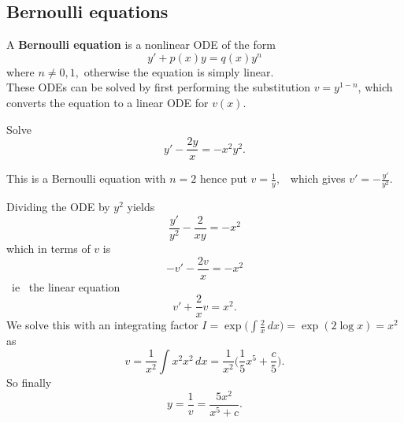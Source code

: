\subsection{Bernoulli equations}
A \textbf{Bernoulli equation} is a nonlinear ODE of the form \[y'+p(x)y=q(x)y^n\] where $n\ne 0,1,$ otherwise the equation is simply linear.\\

These ODEs can be solved by first performing the substitution $v=y^{1-n}$, which converts the equation to a linear ODE for $v(x)$.\\

\begin{example}
    Solve $$y'-\frac{2y}{x}=-x^2y^2.$$

    This is a Bernoulli equation with $n=2$ hence put $v=\frac{1}{y},$ \ which gives $v'=-\frac{y'}{y^2}.$

    Dividing the ODE by $y^2$ yields \[\frac{y'}{y^2}-\frac{2}{xy}=-x^2\] which in terms of $v$ is \[-v'-\frac{2v}{x}=-x^2\] \ ie \ the linear equation \[v'+\frac{2}{x}v=x^2.\] We solve this with an integrating factor $I=\exp\bigg(\int \frac{2}{x}\, dx\bigg)=\exp(2\log x)=x^2$ as
    \[v=\frac{1}{x^2}\int x^2 x^2\, dx =\frac{1}{x^2}\bigg(\frac{1}{5}x^5+\frac{c}{5}\bigg).\]
    So finally \[y=\frac{1}{v}=\frac{5x^2}{x^5+c}.\]
\end{example}

\newpage
